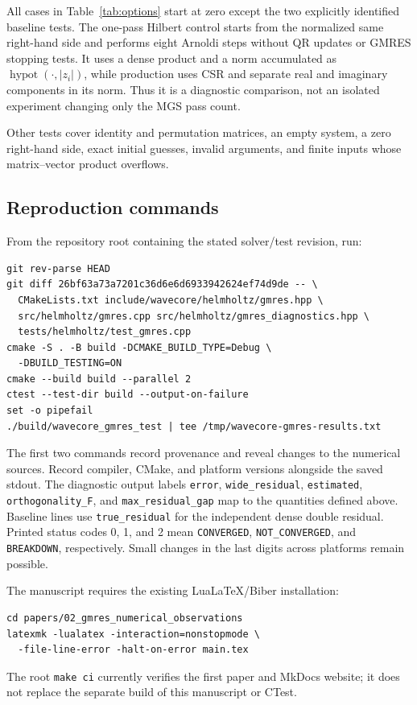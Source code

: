 All cases in Table~\ref{tab:options} start at zero except the two explicitly
identified baseline tests. The one-pass Hilbert control starts from the normalized
same right-hand side and performs eight Arnoldi steps without QR updates or
GMRES stopping tests. It uses a dense product and a norm accumulated as
$\operatorname{hypot}(\cdot,|z_i|)$, while production uses CSR and separate real
and imaginary components in its norm. Thus it is a diagnostic comparison, not
an isolated experiment changing only the MGS pass count.

Other tests cover identity and permutation matrices, an empty system, a zero
right-hand side, exact initial guesses, invalid arguments, and finite inputs
whose matrix--vector product overflows.

\subsection{Reproduction commands}

From the repository root containing the stated solver/test revision, run:
\begin{verbatim}
git rev-parse HEAD
git diff 26bf63a73a7201c36d6e6d6933942624ef74d9de -- \
  CMakeLists.txt include/wavecore/helmholtz/gmres.hpp \
  src/helmholtz/gmres.cpp src/helmholtz/gmres_diagnostics.hpp \
  tests/helmholtz/test_gmres.cpp
cmake -S . -B build -DCMAKE_BUILD_TYPE=Debug \
  -DBUILD_TESTING=ON
cmake --build build --parallel 2
ctest --test-dir build --output-on-failure
set -o pipefail
./build/wavecore_gmres_test | tee /tmp/wavecore-gmres-results.txt
\end{verbatim}
The first two commands record provenance and reveal changes to the numerical
sources. Record compiler, CMake, and platform versions alongside the saved
stdout. The diagnostic output labels \texttt{error}, \texttt{wide\_residual},
\texttt{estimated}, \texttt{orthogonality\_F}, and \texttt{max\_residual\_gap}
map to the quantities defined above. Baseline lines use \texttt{true\_residual}
for the independent dense double residual. Printed status codes 0, 1, and 2 mean
\texttt{CONVERGED}, \texttt{NOT\_CONVERGED}, and \texttt{BREAKDOWN}, respectively.
Small changes in the last digits across platforms remain possible.

The manuscript requires the existing LuaLaTeX/Biber installation:
\begin{verbatim}
cd papers/02_gmres_numerical_observations
latexmk -lualatex -interaction=nonstopmode \
  -file-line-error -halt-on-error main.tex
\end{verbatim}
The root \texttt{make ci} currently verifies the first paper and MkDocs website;
it does not replace the separate build of this manuscript or CTest.
